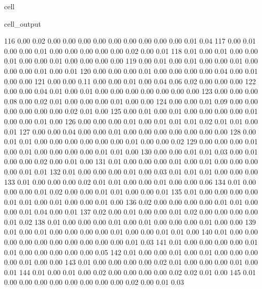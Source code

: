 \documentclass[letterpaper,10pt,french]{sphinxmanual}
\begin{document}
\begin{sphinxuseclass}{cell}
\begin{sphinxuseclass}{cell_output}
\begin{sphinxVerbatim}[commandchars=\\\{\}]
       116	0.00 	0.02 	0.00 	0.00 	0.00 	0.00 	0.00 	0.00 	0.00 	0.00 	0.00 	0.01 	0.04
       117	0.00 	0.01 	0.00 	0.00 	0.01 	0.00 	0.00 	0.00 	0.00 	0.00 	0.02 	0.00 	0.01
       118	0.01 	0.00 	0.01 	0.00 	0.00 	0.01 	0.00 	0.00 	0.01 	0.00 	0.00 	0.00 	0.00
       119	0.00 	0.01 	0.00 	0.01 	0.00 	0.00 	0.01 	0.00 	0.00 	0.00 	0.01 	0.00 	0.01
       120	0.00 	0.00 	0.00 	0.01 	0.00 	0.00 	0.00 	0.00 	0.04 	0.00 	0.01 	0.00 	0.00
       121	0.00 	0.00 	0.11 	0.00 	0.00 	0.01 	0.00 	0.04 	0.06 	0.02 	0.00 	0.00 	0.00
       122	0.00 	0.00 	0.04 	0.01 	0.00 	0.01 	0.00 	0.00 	0.00 	0.00 	0.00 	0.00 	0.00
       123	0.00 	0.00 	0.00 	0.08 	0.00 	0.02 	0.01 	0.00 	0.00 	0.00 	0.01 	0.00 	0.00
       124	0.00 	0.00 	0.01 	0.09 	0.00 	0.00 	0.00 	0.00 	0.00 	0.00 	0.02 	0.01 	0.00
       125	0.00 	0.01 	0.00 	0.01 	0.00 	0.00 	0.00 	0.00 	0.01 	0.00 	0.00 	0.01 	0.00
       126	0.00 	0.00 	0.00 	0.01 	0.00 	0.01 	0.01 	0.01 	0.02 	0.01 	0.01 	0.00 	0.01
       127	0.00 	0.00 	0.04 	0.00 	0.00 	0.01 	0.00 	0.00 	0.00 	0.00 	0.00 	0.00 	0.00
       128	0.00 	0.01 	0.01 	0.00 	0.00 	0.00 	0.00 	0.00 	0.00 	0.01 	0.00 	0.00 	0.02
       129	0.00 	0.00 	0.00 	0.01 	0.00 	0.01 	0.00 	0.00 	0.00 	0.00 	0.01 	0.01 	0.00
       130	0.00 	0.00 	0.01 	0.01 	0.03 	0.00 	0.01 	0.00 	0.00 	0.02 	0.00 	0.01 	0.00
       131	0.01 	0.00 	0.00 	0.00 	0.01 	0.00 	0.01 	0.00 	0.00 	0.00 	0.00 	0.01 	0.01
       132	0.01 	0.00 	0.00 	0.00 	0.01 	0.00 	0.03 	0.01 	0.01 	0.01 	0.00 	0.00 	0.00
       133	0.01 	0.00 	0.00 	0.00 	0.02 	0.01 	0.01 	0.00 	0.00 	0.01 	0.00 	0.00 	0.06
       134	0.01 	0.00 	0.00 	0.00 	0.01 	0.02 	0.00 	0.00 	0.01 	0.01 	0.00 	0.00 	0.01
       135	0.01 	0.00 	0.00 	0.00 	0.00 	0.01 	0.01 	0.00 	0.01 	0.00 	0.00 	0.01 	0.00
       136	0.02 	0.00 	0.00 	0.00 	0.00 	0.01 	0.01 	0.00 	0.00 	0.01 	0.04 	0.00 	0.01
       137	0.02 	0.00 	0.01 	0.00 	0.00 	0.01 	0.02 	0.00 	0.00 	0.00 	0.00 	0.01 	0.02
       138	0.01 	0.00 	0.00 	0.00 	0.01 	0.00 	0.01 	0.00 	0.00 	0.00 	0.01 	0.00 	0.00
       139	0.01 	0.00 	0.01 	0.00 	0.00 	0.00 	0.00 	0.01 	0.00 	0.00 	0.01 	0.01 	0.00
       140	0.01 	0.00 	0.00 	0.00 	0.00 	0.00 	0.00 	0.00 	0.00 	0.00 	0.00 	0.01 	0.03
       141	0.01 	0.00 	0.00 	0.00 	0.00 	0.01 	0.01 	0.00 	0.00 	0.00 	0.00 	0.00 	0.05
       142	0.01 	0.00 	0.00 	0.01 	0.00 	0.01 	0.00 	0.00 	0.00 	0.00 	0.01 	0.00 	0.00
       143	0.01 	0.00 	0.00 	0.00 	0.00 	0.02 	0.01 	0.00 	0.00 	0.00 	0.01 	0.00 	0.01
       144	0.01 	0.00 	0.01 	0.00 	0.02 	0.00 	0.00 	0.00 	0.00 	0.02 	0.02 	0.01 	0.00
       145	0.01 	0.00 	0.00 	0.00 	0.00 	0.00 	0.00 	0.00 	0.00 	0.02 	0.00 	0.01 	0.03

\end{sphinxVerbatim}
\end{sphinxuseclass}
\end{sphinxuseclass}
\end{document}
